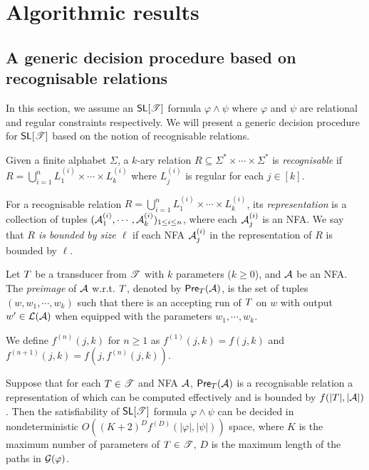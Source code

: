 
\section{Algorithmic results}
\label{sec:algo}


\subsection{A generic decision procedure based on recognisable relations}

In this section, we assume an $\textsf{SL}[\mathscr{T}]$ formula $\varphi \wedge \psi$ where $\varphi$ and $\psi$ are relational and  regular constraints respectively.
We will present a generic decision procedure for $\textsf{SL}[\mathscr{T}]$ based on the notion of recognisable relations.

\begin{definition}
	Given a finite alphabet $\Sigma$, a $k$-ary relation $R\subseteq \Sigma^*\times \cdots\times \Sigma^*$ is \emph{recognisable}  if $R=\bigcup_{i=1}^n L^{(i)}_1\times \cdots\times L^{(i)}_k$ where $L^{(i)}_j$ is regular for each $j\in [k]$.
%
\end{definition}

For a recognisable relation $R=\bigcup_{i=1}^n L^{(i)}_1\times \cdots\times L^{(i)}_k$, its \emph{representation} is a collection of tuples $(\mathcal{A}^{(i)}_1, \cdots, \mathcal{A}^{(i)}_k)_{1 \le i \le n}$, where each $\mathcal{A}^{(i)}_j$ is an NFA.  
We say that \emph{$R$ is bounded by size $\ell$} if each NFA  $\mathcal{A}^{(i)}_j$ in the representation of $R$ is bounded by $\ell$. 

Let $T$ be a transducer from $\mathscr{T}$ with $k$ parameters ($k\geq 0$), and $\mathcal{A}$ be an NFA. The \emph{preimage} of $\mathcal{A}$ w.r.t. $T$, denoted by $\textsf{Pre}_{T}(\mathcal{A})$, is the set of tuples $(w, w_1,\cdots, w_k)$ such that there is an accepting run of $T$ on $w$ with output $w'\in \mathcal{L}(\mathcal{A})$ when equipped with the parameters $w_1,\cdots, w_k$. 


We define $f^{(n)}(j, k)$ for $n\geq 1$ as $f^{(1)}(j,k)= f(j, k)$ and $f^{(n+1)}(j, k) = f(j, f^{(n)}(j,k))$.

\begin{theorem}\label{thm-generic-dec}
Suppose that %
for each $T \in \mathscr{T}$ and NFA $\mathcal{A}$, $\textsf{Pre}_{T}(\mathcal{A})$ is a recognisable relation a representation of which can be computed effectively and  is bounded by %
$f(|T|, |\mathcal{A}|)$. Then the satisfiability of $\textsf{SL}[\mathscr{T}]$ formula $\varphi \wedge \psi$ can be decided in nondeterministic  $O((K+2)^D f^{(D)}(|\varphi|, |\psi|))$ space, where $K$ is the maximum number of parameters of $T \in \mathscr{T}$, 
$D$ is the maximum length of the paths in $\mathcal{G}(\varphi)$.
\end{theorem}

